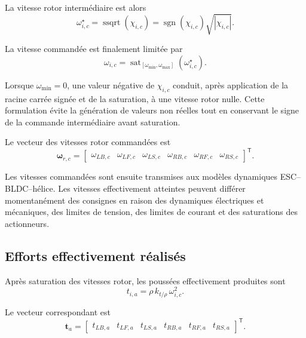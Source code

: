 \documentclass[11pt,a4paper,oneside]{report}
\newcommand{\vect}[1]{\bm{#1}}
\newcommand{\trans}{^{\mathsf T}}
\newcommand{\sat}{\operatorname{sat}}
\begin{document}
La vitesse rotor intermédiaire est alors
\begin{equation}
	\omega_{i,c}^{\star}
	=
	\operatorname{ssqrt}\!\left(\chi_{i,c}\right)
	=
	\operatorname{sgn}\!\left(\chi_{i,c}\right)
	\sqrt{\left|\chi_{i,c}\right|}.
	\label{eq_rotor_signed_speed_command}
\end{equation}

La vitesse commandée est finalement limitée par
\begin{equation}
	\omega_{i,c}
	=
	\sat_{[\omega_{\min},\omega_{\max}]}
	\left(
	\omega_{i,c}^{\star}
	\right).
	\label{eq_rotor_speed_command_saturation}
\end{equation}

Lorsque $\omega_{\min}=0$, une valeur négative de $\chi_{i,c}$ conduit, après application de la racine carrée signée et de la saturation, à une vitesse rotor nulle. Cette formulation évite la génération de valeurs non réelles tout en conservant le signe de la commande intermédiaire avant saturation.

Le vecteur des vitesses rotor commandées est
\begin{equation}
	\vect\omega_{r,c}
	=
	\begin{bmatrix}
		\omega_{LB,c} &
		\omega_{LF,c} &
		\omega_{LS,c} &
		\omega_{RB,c} &
		\omega_{RF,c} &
		\omega_{RS,c}
	\end{bmatrix}\trans.
	\label{eq_commanded_rotor_speed_vector}
\end{equation}

Les vitesses commandées sont ensuite transmises aux modèles dynamiques ESC--BLDC--hélice. Les vitesses effectivement atteintes peuvent différer momentanément des consignes en raison des dynamiques électriques et mécaniques, des limites de tension, des limites de courant et des saturations des actionneurs.

\subsection{Efforts effectivement réalisés}

Après saturation des vitesses rotor, les poussées effectivement produites sont
\begin{equation}
	t_{i,a}
	=
	\rho\,k_{t/\rho}\,\omega_{i,c}^{2}.
	\label{eq_achieved_rotor_thrust}
\end{equation}

Le vecteur correspondant est
\begin{equation}
	\vect t_a
	=
	\begin{bmatrix}
		t_{LB,a} &
		t_{LF,a} &
		t_{LS,a} &
		t_{RB,a} &
		t_{RF,a} &
		t_{RS,a}
	\end{bmatrix}\trans.
\end{equation}
\end{document}
